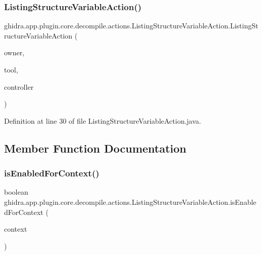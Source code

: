 \subsubsection{\texorpdfstring{ListingStructureVariableAction()}{ListingStructureVariableAction()}}
{\footnotesize\ttfamily ghidra.\+app.\+plugin.\+core.\+decompile.\+actions.\+Listing\+Structure\+Variable\+Action.\+Listing\+Structure\+Variable\+Action (\begin{DoxyParamCaption}\item[{String}]{owner,  }\item[{Plugin\+Tool}]{tool,  }\item[{\mbox{\hyperlink{classghidra_1_1app_1_1decompiler_1_1component_1_1_decompiler_controller}{Decompiler\+Controller}}}]{controller }\end{DoxyParamCaption})\hspace{0.3cm}{\ttfamily [inline]}}



Definition at line 30 of file Listing\+Structure\+Variable\+Action.\+java.



\subsection{Member Function Documentation}
\mbox{\label{classghidra_1_1app_1_1plugin_1_1core_1_1decompile_1_1actions_1_1_listing_structure_variable_action_a0f5a8d5621741704fa1101274dfe091f}} 
\subsubsection{\texorpdfstring{isEnabledForContext()}{isEnabledForContext()}}
{\footnotesize\ttfamily boolean ghidra.\+app.\+plugin.\+core.\+decompile.\+actions.\+Listing\+Structure\+Variable\+Action.\+is\+Enabled\+For\+Context (\begin{DoxyParamCaption}\item[{Action\+Context}]{context }\end{DoxyParamCaption})\hspace{0.3cm}{\ttfamily [inline]}}



